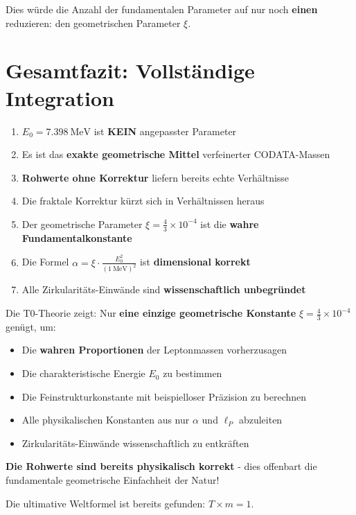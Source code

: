 	Dies würde die Anzahl der fundamentalen Parameter auf nur noch \textbf{einen} reduzieren: den geometrischen Parameter $\xi$.
	
	\section{Gesamtfazit: Vollständige Integration}
	
	\begin{tcolorbox}[colback=red!5!white,colframe=red!75!black,title=Vollständige Zusammenfassung]
		\begin{enumerate}
			\item $E_0 = \SI{7.398}{\MeV}$ ist \textbf{KEIN} angepasster Parameter
			\item Es ist das \textbf{exakte geometrische Mittel} verfeinerter CODATA-Massen
			\item \textbf{Rohwerte ohne Korrektur} liefern bereits echte Verhältnisse
			\item Die fraktale Korrektur kürzt sich in Verhältnissen heraus
			\item Der geometrische Parameter $\xi = \frac{4}{3} \times 10^{-4}$ ist die \textbf{wahre Fundamentalkonstante}
			\item Die Formel $\alpha = \xi \cdot \frac{E_0^2}{( \SI{1}{\MeV} )^2}$ ist \textbf{dimensional korrekt}
			\item Alle Zirkularitäts-Einwände sind \textbf{wissenschaftlich unbegründet}
		\end{enumerate}
	\end{tcolorbox}
	
	\vspace{1cm}
	
	\begin{tcolorbox}[colback=green!10!white,colframe=green!75!black,title=Die ultimative Revolutionäre Erkenntnis]
		Die T0-Theorie zeigt: Nur \textbf{eine einzige geometrische Konstante} $\xi = \frac{4}{3} \times 10^{-4}$ genügt, um:
		
		\begin{itemize}
			\item Die \textbf{wahren Proportionen} der Leptonmassen vorherzusagen
			\item Die charakteristische Energie $E_0$ zu bestimmen  
			\item Die Feinstrukturkonstante mit beispielloser Präzision zu berechnen
			\item Alle physikalischen Konstanten aus nur $\alpha$ und $\ell_P$ abzuleiten
			\item Zirkularitäts-Einwände wissenschaftlich zu entkräften
		\end{itemize}
		
		\textbf{Die Rohwerte sind bereits physikalisch korrekt} - dies offenbart die fundamentale geometrische Einfachheit der Natur!
		
		\vspace{0.5cm}
		Die ultimative Weltformel ist bereits gefunden: $T \times m = 1$.
	\end{tcolorbox}
	